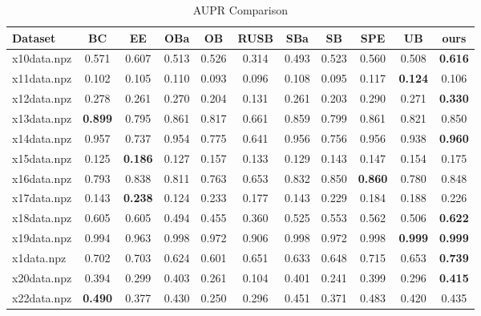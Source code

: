 \documentclass{article}
\begin{document}
\begin{table}[htbp]
\centering
\caption{AUPR Comparison}
\begin{adjustbox}{width=\textwidth}
\label{tab:aupr_comparison}
\begin{tabular}{lcccccccccc}
\hline
\textbf{Dataset} & \textbf{BC} & \textbf{EE} & \textbf{OBa} & \textbf{OB} & \textbf{RUSB} & \textbf{SBa} & \textbf{SB} & \textbf{SPE} & \textbf{UB} & \textbf{ours} \\
\hline
x10data.npz & 0.571 & 0.607 & 0.513 & 0.526 & 0.314 & 0.493 & 0.523 & 0.560 & 0.508 & \cellcolor{graybg}\textbf{0.616} \\
x11data.npz & 0.102 & 0.105 & 0.110 & 0.093 & 0.096 & 0.108 & 0.095 & 0.117 & \cellcolor{graybg}\textbf{0.124} & 0.106 \\
x12data.npz & 0.278 & 0.261 & 0.270 & 0.204 & 0.131 & 0.261 & 0.203 & 0.290 & 0.271 & \cellcolor{graybg}\textbf{0.330} \\
x13data.npz & \cellcolor{graybg}\textbf{0.899} & 0.795 & 0.861 & 0.817 & 0.661 & 0.859 & 0.799 & 0.861 & 0.821 & 0.850 \\
x14data.npz & 0.957 & 0.737 & 0.954 & 0.775 & 0.641 & 0.956 & 0.756 & 0.956 & 0.938 & \cellcolor{graybg}\textbf{0.960} \\
x15data.npz & 0.125 & \cellcolor{graybg}\textbf{0.186} & 0.127 & 0.157 & 0.133 & 0.129 & 0.143 & 0.147 & 0.154 & 0.175 \\
x16data.npz & 0.793 & 0.838 & 0.811 & 0.763 & 0.653 & 0.832 & 0.850 & \cellcolor{graybg}\textbf{0.860} & 0.780 & 0.848 \\
x17data.npz & 0.143 & \cellcolor{graybg}\textbf{0.238} & 0.124 & 0.233 & 0.177 & 0.143 & 0.229 & 0.184 & 0.188 & 0.226 \\
x18data.npz & 0.605 & 0.605 & 0.494 & 0.455 & 0.360 & 0.525 & 0.553 & 0.562 & 0.506 & \cellcolor{graybg}\textbf{0.622} \\
x19data.npz & 0.994 & 0.963 & 0.998 & 0.972 & 0.906 & 0.998 & 0.972 & 0.998 & \cellcolor{graybg}\textbf{0.999} & \cellcolor{graybg}\textbf{0.999} \\
x1data.npz & 0.702 & 0.703 & 0.624 & 0.601 & 0.651 & 0.633 & 0.648 & 0.715 & 0.653 & \cellcolor{graybg}\textbf{0.739} \\
x20data.npz & 0.394 & 0.299 & 0.403 & 0.261 & 0.104 & 0.401 & 0.241 & 0.399 & 0.296 & \cellcolor{graybg}\textbf{0.415} \\
x22data.npz & \cellcolor{graybg}\textbf{0.490} & 0.377 & 0.430 & 0.250 & 0.296 & 0.451 & 0.371 & 0.483 & 0.420 & 0.435 \\

\end{tabular}
\end{adjustbox}
\end{table}
\end{document}
